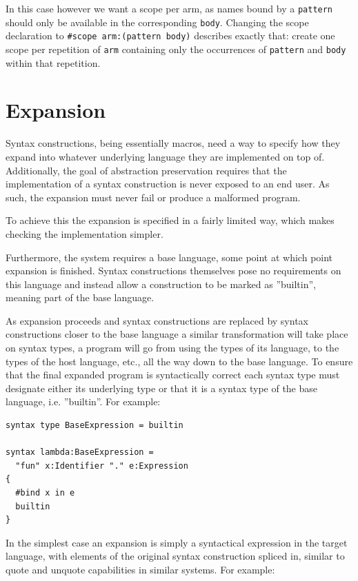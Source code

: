 \documentclass{kththesis}
\begin{document}
In this case however we want a scope per arm, as names bound by a \texttt{pattern} should only be available in the corresponding \texttt{body}. Changing the scope declaration to \texttt{#scope arm:(pattern body)} describes exactly that: create one scope per repetition of \texttt{arm} containing only the occurrences of \texttt{pattern} and \texttt{body} within that repetition.

\section{Expansion} \label{sec:design-implementation}

Syntax constructions, being essentially macros, need a way to specify how they expand into whatever underlying language they are implemented on top of. Additionally, the goal of abstraction preservation requires that the implementation of a syntax construction is never exposed to an end user. As such, the expansion must never fail or produce a malformed program.

To achieve this the expansion is specified in a fairly limited way, which makes checking the implementation simpler.

Furthermore, the system requires a base language, some point at which point expansion is finished. Syntax constructions themselves pose no requirements on this language and instead allow a construction to be marked as ''builtin'', meaning part of the base language.

As expansion proceeds and syntax constructions are replaced by syntax constructions closer to the base language a similar transformation will take place on syntax types, a program will go from using the types of its language, to the types of the host language, etc., all the way down to the base language. To ensure that the final expanded program is syntactically correct each syntax type must designate either its underlying type or that it is a syntax type of the base language, i.e. ''builtin''. For example:

\begin{verbatim}
syntax type BaseExpression = builtin

syntax lambda:BaseExpression =
  "fun" x:Identifier "." e:Expression
{
  #bind x in e
  builtin
}
\end{verbatim}

In the simplest case an expansion is simply a syntactical expression in the target language, with elements of the original syntax construction spliced in, similar to quote and unquote capabilities in similar systems. For example:
\end{document}
